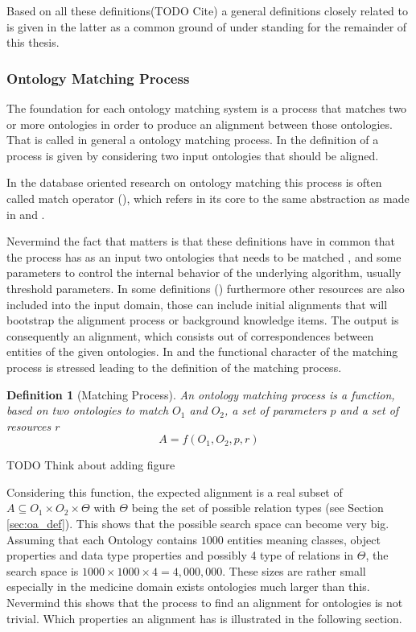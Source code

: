\documentclass[11pt,titlepage,oneside,openany,a4paper]{report}
\newtheorem{definition}{Definition}[chapter]
\begin{document}
Based on all these definitions(TODO Cite) a general definitions closely related to \cite{euzenat2013d} is given in the latter as a common ground of under standing for the remainder of this thesis.
\subsubsection{Ontology Matching Process}
\label{sec:om_process}
The foundation for each ontology matching system is a process that matches two or more ontologies in order to produce an alignment between those ontologies. That is called in general a ontology matching process. In the definition of a process is given by considering two input ontologies that should be aligned.

In the database oriented research on ontology matching this process is often called match operator (\cite{Rahm:2001}), which refers in its core to the same abstraction as made in \cite{euzenat2013d} and  \cite{ehrig2006ontology}.

Nevermind the fact that matters is that these definitions have in common that the process has as an input two ontologies that needs to be matched , and some parameters to control the internal behavior of the underlying algorithm, usually threshold parameters. In some definitions (\cite{euzenat2004api}) furthermore other resources are also included into the input domain, those can include initial alignments that will bootstrap the alignment process or background knowledge items. The output is consequently an alignment, which consists out of correspondences between entities of the given ontologies. In \cite{euzenat2013d} and  \cite{ehrig2006ontology} the functional character of the matching process is stressed leading to the definition of the matching process.

\begin{definition} [Matching Process]
An ontology matching process is a function, based on two ontologies to match $O_1$ and $O_2$, a set of parameters $p$ and  a set of resources $r$
\begin{equation*}
A = f (O_1, O_2, p,r)
\end{equation*}
\end{definition}

\begin{LARGE}
TODO Think about adding figure
\end{LARGE}

Considering this function, the expected alignment is a real subset of $ A \subseteq O_1 \times O_2 \times \Theta$ with $\Theta$ being the set of possible relation types (see Section \ref{sec:oa_def}). This shows that the possible search space can become very big. Assuming that each Ontology contains $1000$ entities meaning classes, object properties and data type properties and possibly 4 type of relations in $\Theta$, the  search space is $1000 \times 1000 \times 4 = 4,000,000$. These sizes are rather small especially in the medicine domain exists ontologies much larger than this.  Nevermind this shows that the process to find an alignment for ontologies is not trivial. \cite{ehrig2006ontology}
Which properties an alignment has is illustrated in the following section.
\end{document}
